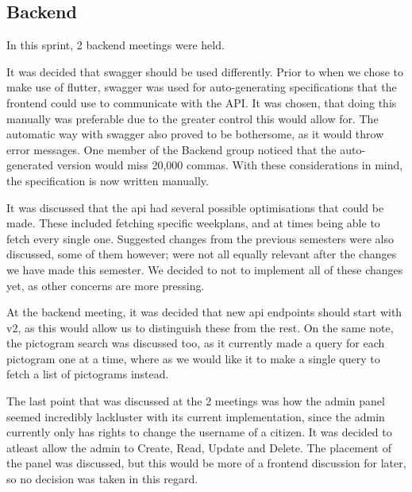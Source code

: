 \subsection{Backend}
In this sprint, 2 backend meetings were held.

It was decided that swagger should be used differently.
Prior to when we chose to make use of flutter, swagger was used for auto-generating specifications that the frontend could use to communicate with the API.
It was chosen, that doing this manually was preferable due to the greater control this would allow for.
The automatic way with swagger also proved to be bothersome, as it would throw error messages.
One member of the Backend group noticed that the auto-generated version would miss 20,000 commas.
With these considerations in mind, the specification is now written manually.

It was discussed that the api had several possible optimisations that could be made.
These included fetching specific weekplans, and at times being able to fetch every single one.
Suggested changes from the previous semesters were also discussed, some of them however; were not all equally relevant after the changes we have made this semester.
We decided to not to implement all of these changes yet, as other concerns are more pressing.

At the backend meeting, it was decided that new api endpoints should start with v2, as this would allow us to distinguish these from the rest.
On the same note, the pictogram search was discussed too, as it currently made a query for each pictogram one at a time, where as we would like it to make a single query to fetch a list of pictograms instead.

The last point that was discussed at the 2 meetings was how the admin panel seemed incredibly lackluster with its current implementation, since the admin currently only has rights to change the username of a citizen. It was decided to atleast allow the admin to Create, Read, Update and Delete. The placement of the panel was discussed, but this would be more of a frontend discussion for later, so no decision was taken in this regard.
